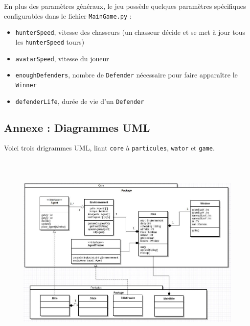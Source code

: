 \documentclass[a4paper]{article}
\begin{document}
En plus des paramètres généraux, le jeu possède quelques paramètres spécifiques configurables dans le fichier \texttt{MainGame.py} :
\begin{itemize}
\item \texttt{hunterSpeed}, vitesse des chasseurs (un chasseur décide et se met à jour tous les \texttt{hunterSpeed} tours)
\item \texttt{avatarSpeed}, vitesse du joueur
\item \texttt{enoughDefenders}, nombre de \texttt{Defender} nécessaire pour faire apparaître le \texttt{Winner}
\item \texttt{defenderLife}, durée de vie d'un \texttt{Defender}
\end{itemize}
\newpage
\begin{landscape}
\section*{Annexe : Diagrammes UML}
Voici trois drigrammes UML, liant \texttt{core} à \texttt{particules}, \texttt{wator} et \texttt{game}.
\begin{figure}[!h]
\centering
\includegraphics[height=10cm]{uml-particule.png}
\end{figure}
\newpage
\begin{figure}[!h]
\centering

\end{figure}
\end{landscape}
\end{document}
